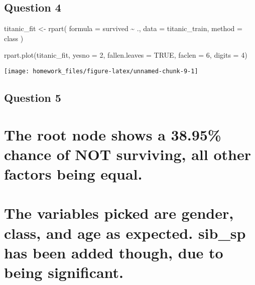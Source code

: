 \documentclass[
]{article}
\newenvironment{Shaded}{\begin{snugshade}}{\end{snugshade}}
\newcommand{\AttributeTok}[1]{\textcolor[rgb]{0.77,0.63,0.00}{#1}}
\newcommand{\ConstantTok}[1]{\textcolor[rgb]{0.00,0.00,0.00}{#1}}
\newcommand{\DecValTok}[1]{\textcolor[rgb]{0.00,0.00,0.81}{#1}}
\newcommand{\FunctionTok}[1]{\textcolor[rgb]{0.00,0.00,0.00}{#1}}
\newcommand{\NormalTok}[1]{#1}
\newcommand{\OtherTok}[1]{\textcolor[rgb]{0.56,0.35,0.01}{#1}}
\newcommand{\SpecialCharTok}[1]{\textcolor[rgb]{0.00,0.00,0.00}{#1}}
\newcommand{\StringTok}[1]{\textcolor[rgb]{0.31,0.60,0.02}{#1}}
\begin{document}
\hypertarget{question-4}{%
\subsection{Question 4}\label{question-4}}

\begin{Shaded}
\begin{Highlighting}[]
\NormalTok{titanic\_fit }\OtherTok{\textless{}{-}} \FunctionTok{rpart}\NormalTok{(}
  \AttributeTok{formula =}\NormalTok{ survived }\SpecialCharTok{\textasciitilde{}}\NormalTok{ ., }
  \AttributeTok{data =}\NormalTok{ titanic\_train, }
  \AttributeTok{method =} \StringTok{\textquotesingle{}class\textquotesingle{}}
\NormalTok{)}

\FunctionTok{rpart.plot}\NormalTok{(titanic\_fit, }
           \AttributeTok{yesno =} \DecValTok{2}\NormalTok{, }
           \AttributeTok{fallen.leaves =} \ConstantTok{TRUE}\NormalTok{, }
           \AttributeTok{faclen =} \DecValTok{6}\NormalTok{, }
           \AttributeTok{digits =} \DecValTok{4}\NormalTok{)}
\end{Highlighting}
\end{Shaded}

\begin{center}\texttt{[image: homework\_files/figure-latex/unnamed-chunk-9-1]} \end{center}

\hypertarget{question-5}{%
\subsection{Question 5}\label{question-5}}

\hypertarget{the-root-node-shows-a-38.95-chance-of-not-surviving-all-other-factors-being-equal.}{%
\section{The root node shows a 38.95\% chance of NOT surviving, all
other factors being
equal.}\label{the-root-node-shows-a-38.95-chance-of-not-surviving-all-other-factors-being-equal.}}

\hypertarget{the-variables-picked-are-gender-class-and-age-as-expected.-sib_sp-has-been-added-though-due-to-being-significant.}{%
\section{The variables picked are gender, class, and age as expected.
sib\_sp has been added though, due to being
significant.}\label{the-variables-picked-are-gender-class-and-age-as-expected.-sib_sp-has-been-added-though-due-to-being-significant.}}
\end{document}
